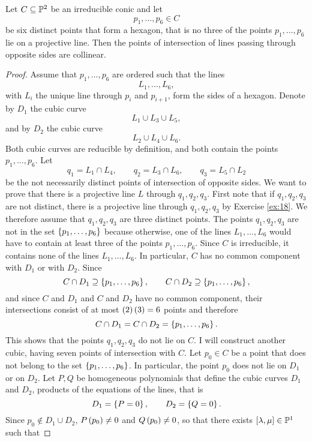 \begin{proposition}
Let $ C \subseteq \P^2 $ be an irreducible conic and let
$$ p_1, \dots, p_6 \in C $$
be six distinct points that form a hexagon, that is no three of the points $ p_1, \dots, p_6 $ lie on a projective line. Then the points of intersection of lines passing through opposite sides are collinear.
\end{proposition}

\pagebreak

\begin{proof}
Assume that $ p_1, \dots, p_6 $ are ordered such that the lines
$$ L_1, \dots, L_6, $$
with $ L_i $ the unique line through $ p_i $ and $ p_{i + 1} $, form the sides of a hexagon. Denote by $ D_1 $ the cubic curve
$$ L_1 \cup L_3 \cup L_5, $$
and by $ D_2 $ the cubic curve
$$ L_2 \cup L_4 \cup L_6. $$
Both cubic curves are reducible by definition, and both contain the points $ p_1, \dots, p_6 $. Let
$$ q_1 = L_1 \cap L_4, \qquad q_2 = L_3 \cap L_6, \qquad q_3 = L_5 \cap L_2 $$
be the not necessarily distinct points of intersection of opposite sides. We want to prove that there is a projective line $ L $ through $ q_1, q_2, q_3 $. First note that if $ q_1, q_2, q_3 $ are not distinct, there is a projective line through $ q_1, q_2, q_3 $ by Exercise \ref{ex:18}. We therefore assume that $ q_1, q_2, q_3 $ are three distinct points. The points $ q_1, q_2, q_3 $ are not in the set $ \cb{p_1, \dots, p_6} $ because otherwise, one of the lines $ L_1, \dots, L_6 $ would have to contain at least three of the points $ p_1, \dots, p_6 $. Since $ C $ is irreducible, it contains none of the lines $ L_1, \dots, L_6 $. In particular, $ C $ has no common component with $ D_1 $ or with $ D_2 $. Since
$$ C \cap D_1 \supseteq \cb{p_1, \dots, p_6}, \qquad C \cap D_2 \supseteq \cb{p_1, \dots, p_6}, $$
and since $ C $ and $ D_1 $ and $ C $ and $ D_2 $ have no common component, their intersections consist of at most $ \rb{2}\rb{3} = 6 $ points and therefore
$$ C \cap D_1 = C \cap D_2 = \cb{p_1, \dots, p_6}. $$
This shows that the points $ q_1, q_2, q_3 $ do not lie on $ C $. I will construct another cubic, having seven points of intersection with $ C $. Let $ p_0 \in C $ be a point that does not belong to the set $ \cb{p_1, \dots, p_6} $. In particular, the point $ p_0 $ does not lie on $ D_1 $ or on $ D_2 $. Let $ P, Q $ be homogeneous polynomials that define the cubic curves $ D_1 $ and $ D_2 $, products of the equations of the lines, that is
$$ D_1 = \cb{P = 0}, \qquad D_2 = \cb{Q = 0}. $$
Since $ p_0 \notin D_1 \cup D_2 $, $ P\rb{p_0} \ne 0 $ and $ Q\rb{p_0} \ne 0 $, so that there exists $ \sb{\lambda, \mu} \in \P^1 $ such that

\end{proof}

